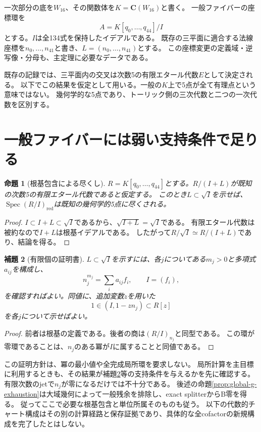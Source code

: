 \documentclass[a4paper,11pt]{ltjsarticle}
\newtheorem{proposition}{命題}[section]
\newtheorem{lemma}[proposition]{補題}
\theoremstyle{definition}
\newcommand{\CC}{\mathbf C}
\newcommand{\Spec}{\operatorname{Spec}}
\newcommand{\red}{\mathrm{red}}
\begin{document}
一次部分の底を\(W_{16}\)、その関数体を\(K=\CC(W_{16})\)と書く。
一般ファイバーの座標環を
\[
 A=K[q_0,\ldots,q_{44}]/I
\]
とする。\(I\)は全134式を保持したイデアルである。
既存の三平面に適合する法線座標を\(n_0,\ldots,n_{41}\)と書き、\(L=(n_0,\ldots,n_{41})\)とする。
この座標変更の定義域・逆写像・分母も、主定理に必要なデータである。

既存の記録では、三平面内の交叉は次数5の有限エタール代数\(E\)として決定される。
以下でこの結果を仮定として用いる。一般の\(K\)上で5点が全て有理点という意味ではない。
幾何学的な5点であり、トーリック側の三次代数と二つの一次代数を区別する。

\section{一般ファイバーには弱い支持条件で足りる}
\begin{proposition}[根基包含による尽くし]\label{prop:radical}
\(R=K[q_0,\ldots,q_{44}]\)とする。\(R/(I+L)\)が既知の次数5の有限エタール代数であると仮定する。
このとき\(L\subset\sqrt I\)を示せば、\(\Spec(R/I)_{\red}\)は既知の幾何学的5点に尽くされる。
\end{proposition}
\begin{proof}
\(I\subset I+L\subset\sqrt I\)であるから、\(\sqrt{I+L}=\sqrt I\)である。
有限エタール代数は被約なので\(I+L\)は根基イデアルである。
したがって\(R/\sqrt I\simeq R/(I+L)\)であり、結論を得る。
\end{proof}

\begin{lemma}[有限個の証明書]\label{lem:certificate}
\(L\subset\sqrt I\)を示すには、各\(j\)についてある\(m_j>0\)と多項式\(a_{ij}\)を構成し、
\[
 n_j^{m_j}=\sum_i a_{ij}f_i,\qquad I=(f_i),
\]
を確認すればよい。同値に、追加変数\(z\)を用いた
\[
 1\in (I,1-zn_j)\subset R[z]
\]
を各\(j\)について示せばよい。
\end{lemma}
\begin{proof}
前者は根基の定義である。後者の商は\((R/I)_{n_j}\)と同型である。
この環が零環であることは、\(n_j\)のある冪が\(I\)に属することと同値である。
\end{proof}

この証明方針は、冪の最小値や全完成局所環を要求しない。
局所計算を主目標に利用するときも、その結果が補題\ref{lem:certificate}等の支持条件を与えるかを先に確認する。
有限次数のjetで\(n_j\)が零になるだけでは不十分である。
後述の命題\ref{prop:global-g-exhaustion}は大域幾何によって一般残余を排除し、exact splitterからB零を得る。
従ってここで必要な根基包含と単位所属そのものも従う。
以下の代数的チャート構成はその別の計算経路と保存証拠であり、具体的な全cofactorの新規構成を完了したとはしない。
\end{document}
